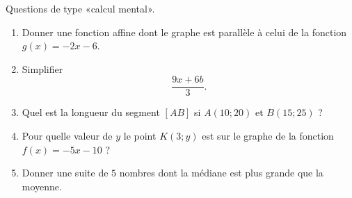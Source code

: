 
\begin{exercice}[\ldots/3]\label{exosmath-0674}

    Questions de type «calcul mental».
    \begin{multicols}{2}
        \begin{enumerate}
            \item
                Donner une fonction affine dont le graphe est parallèle à celui de la fonction \( g(x)=-2x-6\).
            \item
                Simplifier
                \begin{equation*}
                    \frac{ 9x+6b }{ 3 }.
                \end{equation*}
            \item
                Quel est la longueur du segment \( [AB]\) si \( A(10;20)\) et \( B(15;25)\) ?
            \item
                Pour quelle valeur de \( y\) le point \( K(3;y)\) est sur le graphe de la fonction \( f(x)=-5x-10\) ?
            \item
                Donner une suite de \( 5\) nombres dont la médiane est plus grande que la moyenne.
        \end{enumerate}
    \end{multicols}

\end{exercice}
